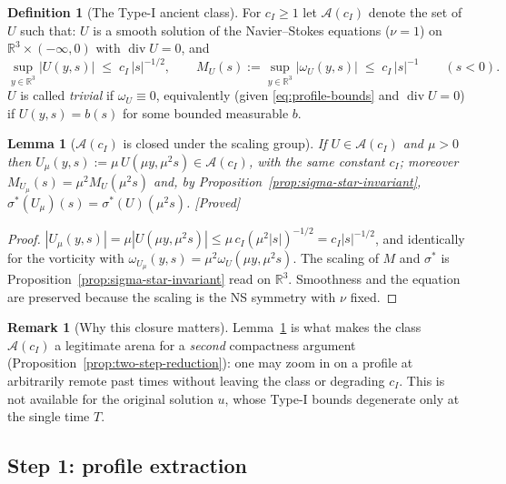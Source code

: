 \documentclass[11pt]{article}
\newtheorem{lemma}[theorem]{Lemma}
\theoremstyle{definition}
\newtheorem{definition}[theorem]{Definition}
\newtheorem{remark}[theorem]{Remark}
\theoremstyle{remark}
\newcommand{\R}{\mathbb{R}}
\begin{document}
\begin{definition}[The Type-I ancient class]\label{def:profile-class}
For $c_I\geq 1$ let $\mathcal{A}(c_I)$ denote the set of $U$ such that:
$U$ is a smooth solution of the Navier--Stokes equations
($\nu=1$) on $\R^3\times(-\infty,0)$ with $\operatorname{div}U=0$, and
\begin{equation}\label{eq:profile-bounds}
  \sup_{y\in\R^3}|U(y,s)| \;\leq\; c_I\,|s|^{-1/2},
  \qquad
  M_U(s) := \sup_{y\in\R^3}|\omega_U(y,s)| \;\leq\; c_I\,|s|^{-1}
  \qquad (s<0).
\end{equation}
$U$ is called \emph{trivial} if $\omega_U\equiv 0$, equivalently (given
\eqref{eq:profile-bounds} and $\operatorname{div}U=0$) if $U(y,s)=b(s)$ for
some bounded measurable $b$.
\end{definition}

\begin{lemma}[$\mathcal{A}(c_I)$ is closed under the scaling group]
  \label{lem:typeI-scaleinv-bounds}
  If $U\in\mathcal{A}(c_I)$ and $\mu>0$ then
  $U_\mu(y,s) := \mu\,U(\mu y,\mu^2 s) \in \mathcal{A}(c_I)$, with the
  \emph{same} constant $c_I$; moreover
  $M_{U_\mu}(s) = \mu^2 M_U(\mu^2 s)$ and, by
  Proposition~\ref{prop:sigma-star-invariant},
  $\sigma^*(U_\mu)(s) = \sigma^*(U)(\mu^2 s)$.
  \emph{[Proved]}
\end{lemma}
\begin{proof}
  $|U_\mu(y,s)| = \mu|U(\mu y,\mu^2 s)| \leq \mu\,c_I(\mu^2|s|)^{-1/2}
  = c_I|s|^{-1/2}$, and identically for the vorticity with
  $\omega_{U_\mu}(y,s) = \mu^2\omega_U(\mu y,\mu^2 s)$. The scaling of
  $M$ and $\sigma^*$ is Proposition~\ref{prop:sigma-star-invariant} read on
  $\R^3$. Smoothness and the equation are preserved because the scaling is
  the NS symmetry with $\nu$ fixed.
\end{proof}

\begin{remark}[Why this closure matters]
Lemma~\ref{lem:typeI-scaleinv-bounds} is what makes the class
$\mathcal{A}(c_I)$ a legitimate arena for a \emph{second} compactness argument
(Proposition~\ref{prop:two-step-reduction}): one may zoom in on a profile at
arbitrarily remote past times without leaving the class or degrading $c_I$.
This is not available for the original solution $u$, whose Type-I bounds
degenerate only at the single time $T$.
\end{remark}

\subsection{Step 1: profile extraction}
\label{subsec:s39-step1}
\end{document}
